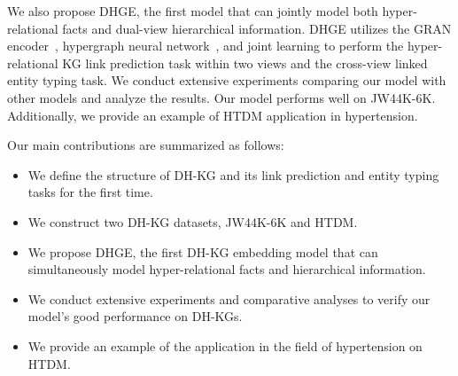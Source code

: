\documentclass[letterpaper]{article} \usepackage{aaai23}  \usepackage{times}  \usepackage{helvet}  \usepackage{courier}  \usepackage[hyphens]{url}  \usepackage{graphicx} \urlstyle{rm} \def\UrlFont{\rm}  \usepackage{natbib}  \usepackage{caption} \frenchspacing  \setlength{\pdfpagewidth}{8.5in}  \setlength{\pdfpageheight}{11in}  \usepackage{times}
\begin{document}
We also propose DHGE, the first model that can jointly model both hyper-relational facts and dual-view hierarchical information. DHGE utilizes the GRAN encoder~\citep{GRAN}, hypergraph neural network~\citep{HGNN}, and joint learning to perform the hyper-relational KG link prediction task within two views and the cross-view linked entity typing task. We conduct extensive experiments comparing our model with other models and analyze the results. Our model performs well on JW44K-6K. Additionally, we provide an example of HTDM application in hypertension.

Our main contributions are summarized as follows:
\begin{itemize}
\item We define the structure of DH-KG and its link prediction and entity typing tasks for the first time.
\item We construct two DH-KG datasets, JW44K-6K and HTDM.
\item We propose DHGE, the first DH-KG embedding model that can simultaneously model hyper-relational facts and hierarchical information. 
\item We conduct extensive experiments and comparative analyses to verify our model's good performance on DH-KGs. 
\item We provide an example of the application in the field of hypertension on HTDM. 
\end{itemize}
\end{document}
